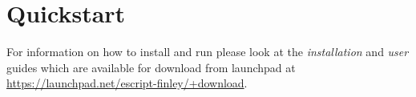 
%
%
%

\section{Quickstart}
For information on how to install and run \esc please look at the \textit{installation} and \textit{user} guides which are available for download from launchpad at  \url{https://launchpad.net/escript-finley/+download}.